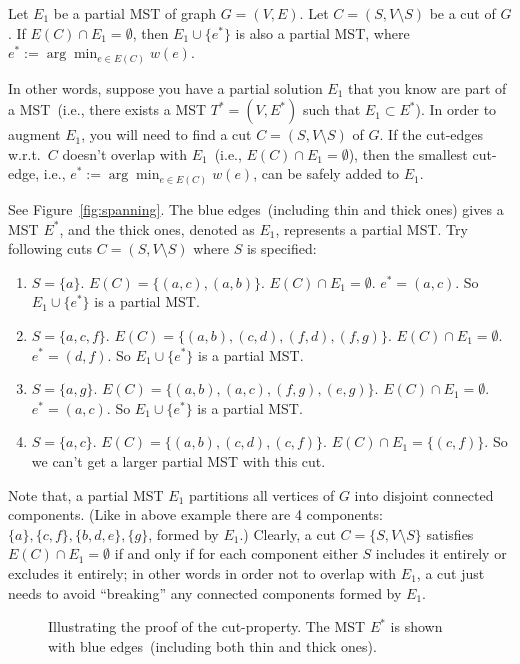 \begin{claim}
Let $E_1$ be a partial MST of graph $G = (V, E)$. %
Let $C = (S,V\setminus S)$ be a cut of $G$.
If $E(C) \cap E_1 = \emptyset$, %
then $E_1\cup \{e^*\}$ is also a partial MST, where $e^* := \arg\min_{e\in E(C)} w(e)$.
\label{claim:cut-property}
\end{claim}

In other words, suppose you have a partial solution $E_1$ that you know
are part of a MST~(i.e., there exists a MST $T^* = (V, E^*)$ such that $E_1\subset E^*$). 
In order to augment $E_1$, you will need to find a cut $C = (S, V\setminus S)$ of $G$.
If the cut-edges w.r.t.\ $C$ doesn't overlap with $E_1$~(i.e., $E(C)\cap E_1 = \emptyset$),
then the smallest cut-edge, i.e., $e^* := \arg\min_{e\in E(C)} w(e)$,
can be safely added to $E_1$.


See Figure~\ref{fig:spanning}. The blue edges~(including thin and thick ones)
gives a MST $E^*$, and the thick ones, denoted as $E_1$, represents a partial MST.
Try following cuts $C = (S, V\setminus S)$ where $S$ is specified:
\begin{enumerate}
\item $S = \{a\}$. $E(C) = \{(a,c), (a,b)\}$. $E(C) \cap E_1 = \emptyset$. $e^* = (a,c)$.
So $E_1\cup\{e^*\}$ is a partial MST.
\item $S = \{a,c,f\}$. $E(C) = \{(a,b), (c,d), (f,d), (f,g)\}$. $E(C) \cap E_1 = \emptyset$. $e^* = (d,f)$.
So $E_1\cup\{e^*\}$ is a partial MST.
\item $S = \{a,g\}$. $E(C) = \{(a,b), (a,c), (f,g), (e,g)\}$. $E(C) \cap E_1 = \emptyset$. $e^* = (a,c)$.
So $E_1\cup\{e^*\}$ is a partial MST.
\item $S = \{a,c\}$. $E(C) = \{(a,b), (c,d), (c,f)\}$. $E(C) \cap E_1 = \{(c,f)\}$. So we can't get a larger partial MST with this cut.
\end{enumerate}

Note that, a partial MST $E_1$ partitions all vertices of $G$ into disjoint connected components.
(Like in above example there are 4 components: $\{a\}, \{c,f\}, \{b,d,e\}, \{g\}$, formed by $E_1$.)
Clearly, a cut $C=\{S,V\setminus S\}$ satisfies $E(C) \cap E_1 = \emptyset$ if and only if for each component
either $S$ includes it entirely or excludes it entirely;
in other words in order not to overlap with $E_1$, a cut just needs to avoid ``breaking''
any connected components formed by $E_1$.

\begin{figure}[!b]
\centering{}
\caption{Illustrating the proof of the cut-property. The MST $E^*$ is shown with blue edges~(including both thin and thick ones).}
\label{fig:proof}
\end{figure}


